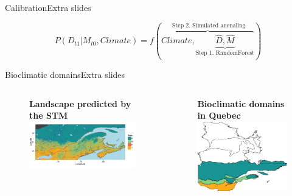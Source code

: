 \documentclass[10pt,aspectratio=149]{beamer}
\begin{document}

\begin{frame}{Calibration}{Extra slides}

	\begin{equation}
		P(D_{t1}|M_{t0}, Climate) = f(\overbrace{Climate, \underbrace{\hat{D}, \hat{M}}_\text{Step 1. RandomForest}}^\text{ Step 2. Simulated anenaling})
	\label{eq1}
	\end{equation}

\end{frame}

\begin{frame}{Bioclimatic domains}{Extra slides}

	  \begin{columns}[t]
        \begin{column}[c]{0.60\linewidth}
		\begin{figure}
			\centering \textbf{Landscape predicted by the STM}
			\includegraphics[width=0.55\paperwidth]{Figs/338_500ts_final_land.pdf}
		\end{figure}
        \end{column}
		\hspace{1em}
        \begin{column}[c]{0.35\linewidth}
		\begin{figure}
			\centering \textbf{Bioclimatic domains in Quebec}
			\includegraphics[width=0.30\paperwidth]{Figs/ss_veg_map.pdf}
		\end{figure}
        \end{column}
      \end{columns}




\end{frame}
\end{document}

